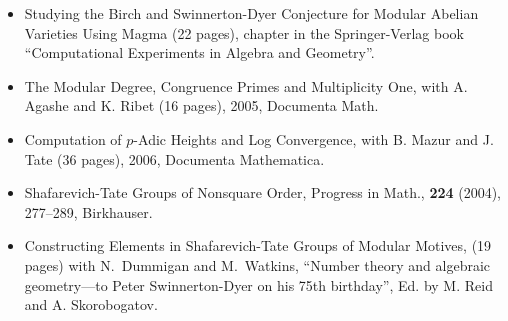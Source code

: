 \documentclass[11pt]{article}
\begin{document}
\begin{itemize}\setlength{\itemsep}{0ex}

  \item {\ptitle Studying the Birch and Swinnerton-Dyer Conjecture
for Modular Abelian Varieties Using Magma} (22 pages), 
chapter in the Springer-Verlag book ``Computational Experiments
in Algebra and Geometry''.%

    
\item {\ptitle The Modular Degree, Congruence Primes and Multiplicity One},
with A. Agashe and K. Ribet (16 pages), 2005, Documenta
Math.

\item {\ptitle Computation of $p$-Adic Heights and Log Convergence},
with B. Mazur and J. Tate (36 pages), 2006, Documenta
Mathematica. 

\item {\ptitle Shafarevich-Tate Groups of Nonsquare Order},
  Progress in Math., {\bf 224} (2004), 277--289, Birkhauser.
  
\item {\ptitle Constructing Elements in Shafarevich-Tate Groups of
Modular Motives}, (19 pages) with N.~Dummigan and M.~Watkins, 
``Number theory and algebraic geometry---to Peter
Swinnerton-Dyer on his 75th birthday'', Ed.
 by   M. Reid and A. Skorobogatov.%

\end{itemize}
\end{document}
